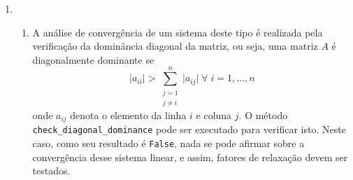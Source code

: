 \documentclass{article}
\newenvironment{arabenum}{
    \begin{enumerate}[label=\textbf{\arabic*})]
}{
    \end{enumerate}
}
\newenvironment{alphenum}{
    \begin{enumerate}[label=(\alph*)]
}{
    \end{enumerate}
}
\begin{document}
\begin{arabenum}
\begin{alphenum}
\item Considera-se $n$ o número de equações do sistema, e $c$ uma unidade de
computação.

\begin{itemize}

\item Para somas, tem-se
\begin{equation*}
\sum_{i=1}^n \sum_{j=i+1}^n c = c \cdot n \cdot \Big( \frac{1}{2}(n-1) \Big)
\end{equation*}

\item Para subtrações, tem-se
\begin{equation*}
c \cdot n + \sum_{i=1}^n \sum_{j=i+1}^n c
+ \sum_{i=1}^n \sum_{j=i+1}^n \sum_{k=i+1}^n c
= c \cdot n \cdot \Big( \frac{1}{6}(2n^2 - 3n + 1) + \frac{1}{2}(n-1) + 1 \Big)
\end{equation*}

\item Para multiplicações, tem-se
\begin{equation*}
2 \cdot \Big( \sum_{i=1}^n \sum_{j=i+1}^n c \Big)
+ \sum_{i=1}^n \sum_{j=i+1}^n \sum_{k=i+1}^n c
= c \cdot n \cdot \Big( (n-1) + \frac{1}{6}(2n^2 - 3n + 1) \Big)
\end{equation*}

\item Para divisões, tem-se
\begin{equation*}
c \cdot n + \sum_{i=1}^n \sum_{j=i+1}^n c
= c \cdot n \cdot \Big( \frac{1}{2}(n-1) + 1 \Big)
\end{equation*}

\end{itemize}

Então, o número final de operações é de
\begin{equation*}
c \cdot n \cdot \Big( \frac{5}{2}(n-1) + \frac{1}{3}(2n^2 - 3n + 1) + 2 \Big).
\end{equation*}

\end{alphenum}

\item \begin{alphenum}

\item A análise de convergência de um sistema deste tipo é realizada pela
verificação da dominância diagonal da matriz, ou seja, uma matriz $A$ é
diagonalmente dominante se
\begin{equation*}
\vert a_{ii} \vert > \sum_{\substack{j=1 \\ j \neq i}}^n \vert a_{ij} \vert
\; \forall \; i = 1, \dots, n
\end{equation*}
onde $a_{ij}$ denota o elemento da linha $i$ e coluna $j$. O método
\texttt{check\_diagonal\_dominance} pode ser executado para verificar isto.
Neste caso, como seu resultado é \verb!False!, nada se pode afirmar sobre a
convergência desse sistema linear, e assim, fatores de relaxação devem ser
testados.


\end{alphenum}
\end{arabenum}
\end{document}
